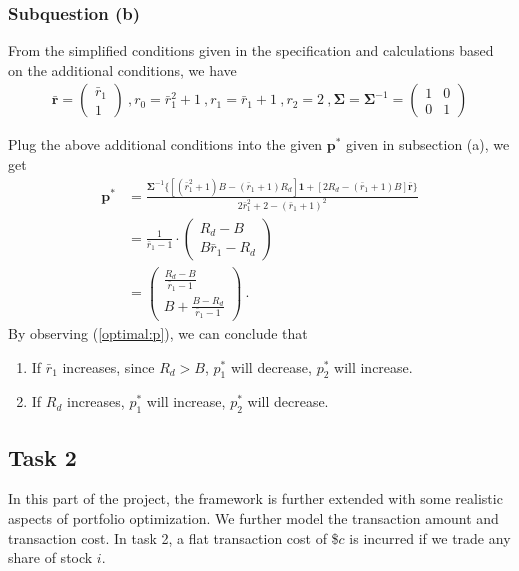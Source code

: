 \documentclass[12pt]{ftec2101}
\newcommand{\vect}[1]{\mathbf{#1}}
\begin{document}
\subsubsection{Subquestion (b)}
From the simplified conditions given in the specification and calculations based on the additional conditions, we have 
\begin{align*}
    \bar{\vect{r}} =
    \begin{pmatrix}
        \bar{r}_1 \\
        1
    \end{pmatrix}\ ,
    r_0 = \bar{r}_1^2+1\ ,
    r_1 = \bar{r}_1 + 1\ , 
    r_2 = 2\ ,
    \boldsymbol{\Sigma} = \boldsymbol{\Sigma}^{-1} =
    \begin{pmatrix}
        1 & 0 \\
        0 & 1
    \end{pmatrix}
\end{align*}


Plug the above additional conditions into the given $\vect{p}^{*}$ given in subsection (a), we get
\begin{align}
    \vect{p}^{*} &= \frac{\boldsymbol{\Sigma}^{-1}\{[(\bar{r}_1^2+1)B-(\bar{r}_1+1)R_d]\vect{1}+[2R_d - (\bar{r}_1 + 1)B]\bar{\vect{r}}\}}{2\bar{r}_1^2 + 2 - (\bar{r}_1+1)^2} \\
    &= \frac{1}{\bar{r}_1 - 1} \cdot
    \begin{pmatrix}
        R_d - B \\
        B\bar{r}_1 - R_d
    \end{pmatrix}\\
    &=
    \begin{pmatrix}
        \frac{R_d-B}{\bar{r}_1 - 1} \\
        B+ \frac{B-R_d}{\bar{r}_1 - 1}
    \end{pmatrix}\ .
    \label{optimal:p}
\end{align}
By observing (\ref{optimal:p}), we can conclude that
\begin{enumerate}
    \item If $\bar{r}_1$ increases, since $R_d > B$, $p_1^{*}$ will decrease, $p_2^{*}$ will increase.
    \item If $R_d$ increases, $p_1^{*}$ will increase, $p_2^{*}$ will decrease.
\end{enumerate}

\subsection{Task 2}
In this part of the project, the framework is further extended with some realistic aspects of portfolio optimization. We further model the transaction amount and transaction cost. In task 2, a flat transaction cost of \$$c$ is incurred if we trade any share of stock $i$.
\end{document}
